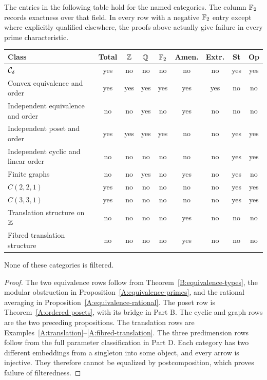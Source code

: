 \begin{corollary}
\label{A:example-table}
The entries in the following table hold for the named
categories. The column $\mathbb F_2$ records exactness over that
field. In every row with a negative $\mathbb F_2$ entry except
where explicitly qualified elsewhere, the proofs above
actually give failure in every prime characteristic.
\begin{center}
\small
\begin{tabular}{lcccccccc}
\toprule
Class & Total & $\mathbb Z$ & $\mathbb Q$ & $\mathbb F_2$ & Amen. & Extr. & St & Op\\
\midrule
$\mathcal C_\delta$ & yes & no & no & no & no & no & yes & yes\\
Convex equivalence and order & yes & yes & yes & yes & yes & yes & no & no\\
Independent equivalence and order & no & no & yes & no & yes & no & no & no\\
Independent poset and order & yes & yes & yes & yes & no & no & yes & yes\\
Independent cyclic and linear order & no & no & no & no & no & no & yes & yes\\
Finite graphs & no & no & yes & no & yes & no & yes & no\\
$C(2,2,1)$ & yes & no & no & no & no & no & yes & yes\\
$C(3,3,1)$ & yes & no & no & no & no & no & yes & yes\\
Translation structure on $\mathbb Z$ & no & no & no & no & yes & no & no & no\\
Fibred translation structure & no & no & no & no & yes & no & no & no\\
\bottomrule
\end{tabular}
\end{center}
None of these categories is filtered.
\end{corollary}
\begin{proof}
The two equivalence rows follow from Theorem~\ref{B:equivalence-types},
the modular obstruction in Proposition~\ref{A:equivalence-primes},
and the rational averaging in Proposition~\ref{A:equivalence-rational}.
The poset row is Theorem~\ref{A:ordered-posets}, with its
bridge in Part B. The cyclic and graph rows are the two
preceding propositions. The translation rows are
Examples~\ref{A:translation}--\ref{A:fibred-translation}.
The three predimension rows follow from the full parameter
classification in Part D. Each category has two different
embeddings from a singleton into some object, and every
arrow is injective. They therefore cannot be equalized by
postcomposition, which proves failure of filteredness.
\end{proof}


